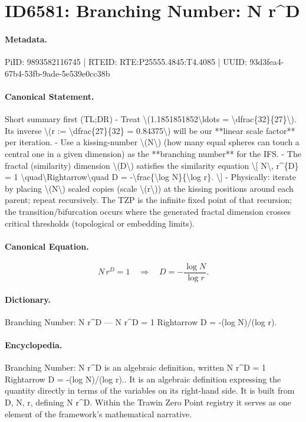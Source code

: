 \section*{ID6581: Branching Number: N r\textasciicircum{}D}
\paragraph{Metadata.}
PiID: 9893582116745 | RTEID: RTE:P25555.4845:T4.4085 | UUID: 93d3fea4-67b4-53fb-9ade-5e539e0cc38b

\paragraph{Canonical Statement.}
Short summary first (TL;DR) - Treat \textbackslash{}(1.1851851852\textbackslash{}ldots = \textbackslash{}dfrac\{32\}\{27\}\textbackslash{}). Its inverse \textbackslash{}(r := \textbackslash{}dfrac\{27\}\{32\} = 0.84375\textbackslash{}) will be our **linear scale factor** per iteration. - Use a kissing-number \textbackslash{}(N\textbackslash{}) (how many equal spheres can touch a central one in a given dimension) as the **branching number** for the IFS. - The fractal (similarity) dimension \textbackslash{}(D\textbackslash{}) satisfies the similarity equation \textbackslash{}[ N\textbackslash{}, r\textasciicircum{}\{D\} = 1 \textbackslash{}quad\textbackslash{}Rightarrow\textbackslash{}quad D = -\textbackslash{}frac\{\textbackslash{}log N\}\{\textbackslash{}log r\}. \textbackslash{}] - Physically: iterate by placing \textbackslash{}(N\textbackslash{}) scaled copies (scale \textbackslash{}(r\textbackslash{})) at the kissing positions around each parent; repeat recursively. The TZP is the infinite fixed point of that recursion; the transition/bifurcation occurs where the generated fractal dimension crosses critical thresholds (topological or embedding limits).

\paragraph{Canonical Equation.}
\[
N\, r^{D} = 1 \quad\Rightarrow\quad D = -\frac{\log N}{\log r}.
\]

\paragraph{Dictionary.}
Branching Number: N r\textasciicircum{}D — N r\textasciicircum{}D = 1 Rightarrow D = -(log N)/(log r).

\paragraph{Encyclopedia.}
Branching Number: N r\textasciicircum{}D is an algebraic definition, written N r\textasciicircum{}D = 1 Rightarrow D = -(log N)/(log r).. It is an algebraic definition expressing the quantity directly in terms of the variables on its right-hand side. It is built from D, N, r, defining N r\textasciicircum{}D. Within the Trawin Zero Point registry it serves as one element of the framework's mathematical narrative.
